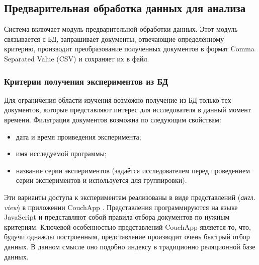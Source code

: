 \subsection{Предварительная обработка данных для анализа}

Система включает модуль предварительной обработки данных. Этот модуль связывается с БД, запрашивает документы, отвечающие определённому критерию, производит преобразование полученных документов в формат Comma Separated Value (CSV) и сохраняет их в файл.

\subsubsection{Критерии получения экспериментов из БД}

Для ограничения области изучения возможно получение из БД только тех документов, которые представляют интерес для исследователя в данный момент времени. Фильтрация документов возможна по следующим свойствам:

\begin{itemize}
\item дата и время проиведения эксперимента;
\item имя исследуемой программы;
\item название серии экспериментов (задаётся исследователем перед проведением серии экспериментов и используется для группировки).
\end{itemize}

Эти варианты доступа к экспериментам реализованы в виде представлений (\textit{англ. view}) в приложении CouchApp \cite{couchapp}. Представления программируются на языке JavaScript и представляют собой правила отбора документов по нужным критериям. Ключевой особенностью представлений CouchApp является то, что, будучи однажды построенным, представление производит очень быстрый отбор данных. В данном смысле оно подобно индексу в традиционно реляционной базе данных.
